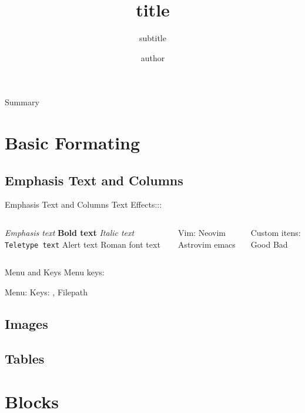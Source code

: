 \documentclass[lang=en-us, aspectratio=169,tokyonight-moon,Frankfurt, 90pt]{darkbeamer}
\author{author}
\title{title}
\subtitle{subtitle}
\institute{My University}
\begin{document}
\begin{frame}{}
	\titlepage
\end{frame}

\begin{frame}{Summary}
	\label{contents}
	\tableofcontents
\end{frame}

\section{Basic Formating}
\subsection{Emphasis Text and Columns}
\begin{frame}{Emphasis Text and Columns}
	Text Effects:::
	\begin{columns}[c]
		\begin{outline}
			\1 \emph{Emphasis text}
			\1 \textbf{Bold text}
			\1 \textit{Italic text}
			\1 \texttt{Teletype text}
			\1 \alert{Alert text}
			\1 \textrm{Roman font text}
		\end{outline}
		\column{.45\textwidth}
		\begin{outline}[enumerate]
			\1 Vim:
			\2 Neovim
			\2 Astrovim
			\1 emacs
		\end{outline}
		\begin{outline}
			\1 Custom itens:
			\2[\gd] Good
			\2[\bd] Bad
		\end{outline}
	\end{columns}
\end{frame}

\begin{frame}{Menu and Keys}
    Menu keys:
    \begin{outline}
        \1 Menu: 
		  \1 Keys: , \keys{\ctrl +v}
        \1 Filepath  
    \end{outline}
\end{frame}

\subsection{Images}
\subsection{Tables}

\section{Blocks}
\end{document}
